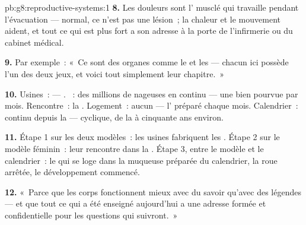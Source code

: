 \begin{solution}{pb:g8:reproductive-systems:1}
\textbf{8.} Les douleurs sont l' musclé qui travaille pendant
l'évacuation --- normal, ce n'est pas une lésion~; la chaleur et le
mouvement aident, et tout ce qui est plus fort a son adresse à la
porte de l'infirmerie ou du cabinet médical.

\textbf{9.} Par exemple~: «~Ce sont des organes comme le  et les
 --- chacun ici possède l'un des deux jeux, et voici tout
simplement leur chapitre.~»

\textbf{10.} Usines~:  --- . ~: des millions
de nageuses en continu --- une  bien pourvue par mois.
Rencontre~: la . Logement~: aucun --- l' préparé chaque
mois. Calendrier~: continu depuis la  --- cyclique, de la
 à cinquante ans environ.

\textbf{11.} Étape 1 sur les deux modèles~: les usines fabriquent
les . Étape 2 sur le modèle féminin~: leur rencontre dans la
. Étape 3, entre le modèle et le calendrier~: le  qui se
loge dans la muqueuse préparée du calendrier, la roue arrêtée, le
développement commencé.

\textbf{12.} «~Parce que les corps fonctionnent mieux avec du savoir
qu'avec des légendes --- et que tout ce qui a été enseigné
aujourd'hui a une adresse formée et confidentielle pour les
questions qui suivront.~»
\end{solution}
